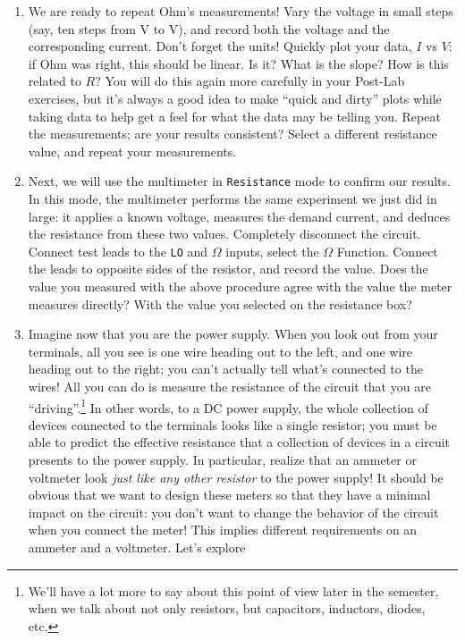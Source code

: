 \documentclass[12pt]{article}
\begin{document}
\begin{enumerate}
\item We are ready to repeat Ohm's measurements!  Vary the voltage in
  small steps (say, ten steps from \unit[0]{V} to \unit[10]{V}), and
  record both the voltage and the corresponding current.  Don't forget
  the units!  Quickly plot your data, $I$ vs $V$: if Ohm was right,
  this should be linear.  Is it?  What is the slope?  How is this
  related to $R$?  You will do this again more carefully in your
  Post-Lab exercises, but it's always a good idea to make ``quick and
  dirty'' plots while taking data to help get a feel for what the data
  may be telling you.  Repeat the measurements; are your results
  consistent?  Select a different resistance value, and repeat your
  measurements.
\item Next, we will use the multimeter in \texttt{Resistance} mode to
  confirm our results.  In this mode, the multimeter performs the same
  experiment we just did in large: it applies a known voltage,
  measures the demand current, and deduces the resistance from these
  two values.  Completely disconnect the circuit.  Connect test leads
  to the \texttt{LO} and \texttt{$\Omega$} inputs, select the
  \texttt{$\Omega$} Function.  Connect the leads to opposite sides of
  the resistor, and record the value.  Does the value you measured
  with the above procedure agree with the value the meter measures
  directly?  With the value you selected on the resistance box?
\item Imagine now that you are the power supply.  When you look out
  from your terminals, all you see is one wire heading out to the
  left, and one wire heading out to the right; you can't actually tell
  what's connected to the wires!  All you can do is measure the
  resistance of the circuit that you are ``driving''.\footnote{We'll
    have a lot more to say about this point of view later in the
    semester, when we talk about not only resistors, but capacitors,
    inductors, diodes, etc.}  In other words, to a DC power supply,
  the whole collection of devices connected to the terminals looks
  like a single resistor; you must be able to predict the effective
  resistance that a collection of devices in a circuit presents to the
  power supply.  In particular, realize that an ammeter or voltmeter
  look \textit{just like any other resistor} to the power supply!  It
  should be obvious that we want to design these meters so that they
  have a minimal impact on the circuit: you don't want to change the
  behavior of the circuit when you connect the meter!  This implies
  different requirements on an ammeter and a voltmeter.  Let's explore

\end{enumerate}
\end{document}
